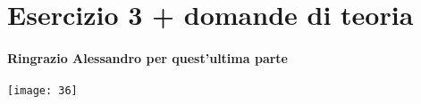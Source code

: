\documentclass[12pt, a4paper, openany, oneside]{book}
\begin{document}
\section{Esercizio 3 + domande di teoria}
\paragraph{Ringrazio Alessandro per quest'ultima parte}
\begin{center}
	\texttt{[image: 36]}
\end{center}
    





























































































































	
\end{document}
